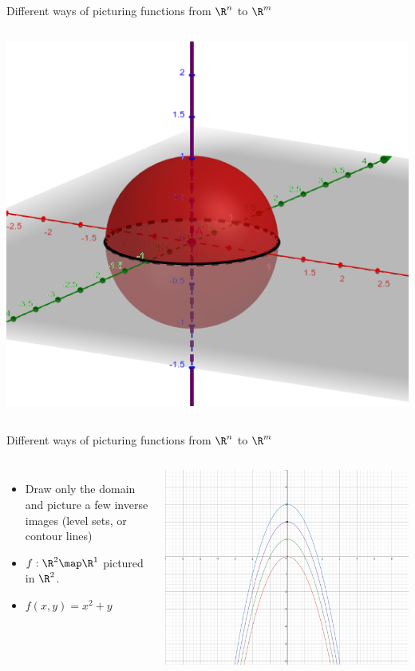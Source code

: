 \documentclass{beamer}
\begin{document}
\begin{frame}{Different ways of picturing functions from $\R^n$ to $\R^m$}
\begin{columns}
\includegraphics[scale=0.15]{sphere2}
\end{columns}

\end{frame}


\begin{frame}{Different ways of picturing functions from $\R^n$ to $\R^m$}

\begin{columns}
\column[T]{5cm}
\begin{itemize}
\item Draw only the domain and picture a few inverse images (level sets,
or contour lines)
\item $f:\R^2\map\R^1$ pictured in $\R^2$.
\item $f(x,y) = x^2 + y$
\end{itemize}

\column[T]{5cm}
\includegraphics[scale=0.1]{contour-parabolas}

\end{columns}

\end{frame}
\end{document}
